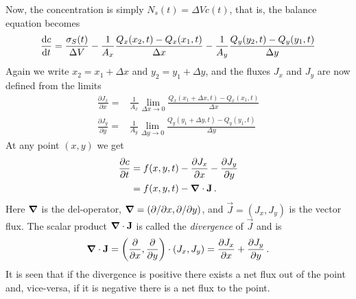 \begin{example}
	Now, the concentration is simply $N_s(t) = \Delta V c(t)$, that is, the balance equation becomes
	\begin{align}
		\frac{\mathrm{d} c}{\mathrm{d} t} = \frac{\sigma_S(t)}{\Delta V} - \frac{1}{A_x} \frac{Q_x(x_2,t)
		-Q_x(x_1,t)}{\Delta x} 
		- \frac{1}{A_y}\frac{Q_y(y_2,t)-Q_y(y_1,t)}{\Delta y}
	\end{align}
	Again we write $x_2 = x_1 + \Delta x$ and $y_2 = y_1 + \Delta y$, and 
	the fluxes $J_x$ and $J_y$ are now defined from the limits 
	\begin{align}
		\frac{\partial J_x}{\partial x} =& \frac{1}{A_x} \lim_{\Delta x \rightarrow 0} 
				\frac{Q_x(x_1 + \Delta x,t) -Q_x(x_1,t)}{\Delta x} 
		\\
		\frac{\partial J_y}{\partial y} =& \frac{1}{A_y} \lim_{\Delta y \rightarrow 0}
		\frac{Q_y(y_1 + \Delta y,t)-Q_y(y_1,t)}{\Delta y}
	\end{align}
	At any point $(x,y)$ we get
	\begin{align}
		\frac{\partial c}{\partial t} &= f(x,y,t) - \frac{\partial J_x}{\partial x} - \frac{\partial
		J_y}{\partial y} \nonumber \\  
		&= f(x,y,t) - \boldsymbol{\nabla} \cdot \mathbf{J} \, .
	\end{align}
	Here $\boldsymbol{\nabla}$ is the del-operator, $\boldsymbol{\nabla} = \left( \partial/\partial x,
	\partial/\partial y \right)$, and $\vec{J} = (J_x, J_y)$ is the vector flux.  
	The scalar product $\boldsymbol{\nabla} \cdot \mathbf{J}$ is called the \emph{divergence} of $\vec{J}$
	and is 
	\begin{equation}
		\boldsymbol{\nabla} \cdot \mathbf{J} = 
		\left( \frac{\partial}{\partial x}, \frac{\partial}{\partial y}\right)
		\cdot (J_x, J_y) = 
		\frac{\partial J_x}{\partial x} + \frac{\partial J_y}{\partial y} \, .
	\end{equation}
	It is seen that if the divergence is positive there exists a net flux out of the point and, vice-versa, if it is 
	negative there is a net flux to the point.


\end{example}
